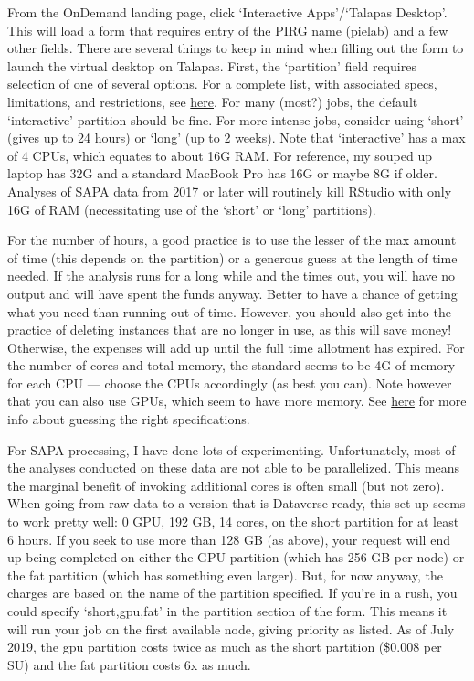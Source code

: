 \documentclass[]{book}
\begin{document}
From the OnDemand landing page, click `Interactive Apps'/`Talapas Desktop'. This will load a form that requires entry of the PIRG name (pielab) and a few other fields. There are several things to keep in mind when filling out the form to launch the virtual desktop on Talapas. First, the `partition' field requires selection of one of several options. For a complete list, with associated specs, limitations, and restrictions, see \href{https://hpcrcf.atlassian.net/wiki/spaces/TCP/pages/7285967/Partition+List}{here}. For many (most?) jobs, the default `interactive' partition should be fine. For more intense jobs, consider using `short' (gives up to 24 hours) or `long' (up to 2 weeks). Note that `interactive' has a max of 4 CPUs, which equates to about 16G RAM. For reference, my souped up laptop has 32G and a standard MacBook Pro has 16G or maybe 8G if older. Analyses of SAPA data from 2017 or later will routinely kill RStudio with only 16G of RAM (necessitating use of the `short' or `long' partitions).

For the number of hours, a good practice is to use the lesser of the max amount of time (this depends on the partition) or a generous guess at the length of time needed. If the analysis runs for a long while and the times out, you will have no output and will have spent the funds anyway. Better to have a chance of getting what you need than running out of time. However, you should also get into the practice of deleting instances that are no longer in use, as this will save money! Otherwise, the expenses will add up until the full time allotment has expired. For the number of cores and total memory, the standard seems to be 4G of memory for each CPU --- choose the CPUs accordingly (as best you can). Note however that you can also use GPUs, which seem to have more memory. See \href{https://hpcrcf.atlassian.net/wiki/spaces/TCP/pages/364773381/Memory}{here} for more info about guessing the right specifications.

For SAPA processing, I have done lots of experimenting. Unfortunately, most of the analyses conducted on these data are not able to be parallelized. This means the marginal benefit of invoking additional cores is often small (but not zero). When going from raw data to a version that is Dataverse-ready, this set-up seems to work pretty well: 0 GPU, 192 GB, 14 cores, on the short partition for at least 6 hours. If you seek to use more than 128 GB (as above), your request will end up being completed on either the GPU partition (which has 256 GB per node) or the fat partition (which has something even larger). But, for now anyway, the charges are based on the name of the partition specified. If you're in a rush, you could specify `short,gpu,fat' in the partition section of the form. This means it will run your job on the first available node, giving priority as listed. As of July 2019, the gpu partition costs twice as much as the short partition (\$0.008 per SU) and the fat partition costs 6x as much.
\end{document}
